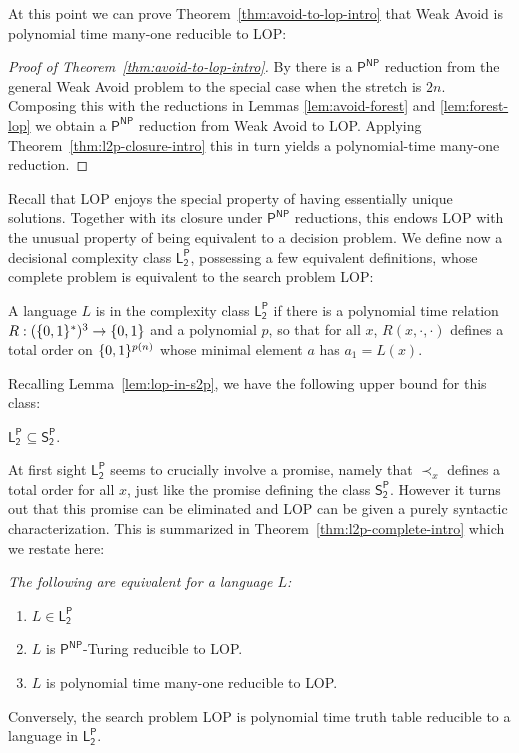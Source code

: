 At this point we can prove Theorem~\ref{thm:avoid-to-lop-intro} that {\sc Weak Avoid} is polynomial time many-one reducible to {\sc LOP}:
\begin{proof}[Proof of Theorem~\ref{thm:avoid-to-lop-intro}]
By \cite{Korten} there is a $\mathsf{P^{NP}}$ reduction from the general {\sc Weak Avoid} problem to the special case when the stretch is $2n$. Composing this with the reductions in Lemmas \ref{lem:avoid-forest} and \ref{lem:forest-lop} we obtain a $\mathsf{P^{NP}}$ reduction from {\sc Weak Avoid} to {\sc LOP}. Applying Theorem~\ref{thm:l2p-closure-intro} this in turn yields a polynomial-time many-one reduction.
\end{proof}

Recall that {\sc LOP} enjoys the special property of having essentially unique solutions. Together with its closure under $\mathsf{P^{NP}}$ reductions, this endows {\sc LOP} with the unusual property of being equivalent to a decision problem. We define now a decisional complexity class $\mathsf{L_2^P}$, possessing a few equivalent definitions, whose complete problem is equivalent to the search problem {\sc LOP}: 
\begin{definition*}
A language $L$ is in the complexity class $\mathsf{L_2^P}$ if there is a polynomial time relation $R: (\{0,1\}^*)^3 \to \{0,1\}$ and a polynomial $p$, so that for all $x$, $R(x, \cdot, \cdot)$ defines a total order on $\{0,1\}^{p(n)}$ whose minimal element $a$ has $a_1 = L(x)$. 
\end{definition*}
Recalling Lemma~\ref{lem:lop-in-s2p}, we have the following upper bound for this class:
\begin{observation}
$\mathsf{L_2^P} \subseteq \mathsf{S_2^P}$.
\end{observation}
At first sight $\mathsf{L_2^P}$ seems to crucially involve a promise, namely that $\prec_x$ defines a total order for all $x$, just like the promise defining the class $\mathsf{S_2^P}$. However it turns out that this promise can be eliminated and {\sc LOP} can be given a purely syntactic characterization. This is summarized in Theorem~\ref{thm:l2p-complete-intro} which we restate here:

\medskip

{\it The following are equivalent for a language $L$:
\begin{enumerate}
    \item $L \in \mathsf{L_2^P}$
    \item $L$ is $\mathsf{P^{NP}}
$-Turing reducible to {\sc LOP}.
    \item $L$ is polynomial time many-one reducible to {\sc LOP}.
\end{enumerate}
Conversely, the search problem {\sc LOP} is polynomial time truth table reducible to a language in $\mathsf{L_2^P}$.}

